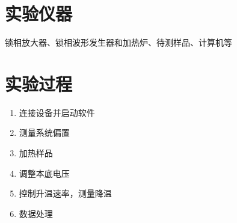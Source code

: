 \section{实验仪器}
    锁相放大器、锁相波形发生器和加热炉、待测样品、计算机等
\section{实验过程}
    \begin{enumerate}
        \item 连接设备并启动软件
        \item 测量系统偏置
        \item 加热样品
        \item 调整本底电压
        \item 控制升温速率，测量降温
        \item 数据处理
    \end{enumerate}
